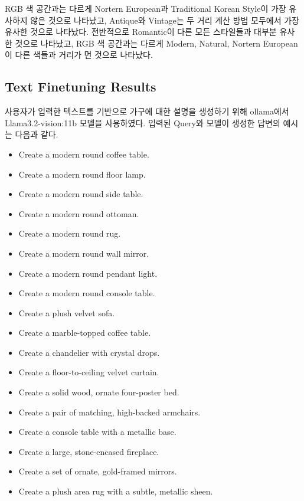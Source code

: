 \documentclass[11pt]{article}
\begin{document}
RGB 색 공간과는 다르게 Nortern European과 Traditional Korean Style이 가장 유사하지 않은 것으로 나타났고, Antique와 Vintage는 두 거리 계산 방법 모두에서 가장 유사한 것으로 나타났다.
전반적으로 Romantic이 다른 모든 스타일들과 대부분 유사한 것으로 나타났고, RGB 색 공간과는 다르게 Modern, Natural, Nortern European이 다른 색들과 거리가 먼 것으로 나타났다.

\subsection{Text Finetuning Results}
사용자가 입력한 텍스트를 기반으로 가구에 대한 설명을 생성하기 위해 ollama에서 Llama3.2-vision:11b 모델을 사용하였다.
입력된 Query와 모델이 생성한 답변의 예시는 다음과 같다.

\begin{description}[labelindent=0cm]
    \item[\textbf{Q1.} A modern room contains round items] 
    \item[\textbf{A1.}]
          \begin{itemize}[noitemsep, topsep=2pt]
              \item Create a modern round coffee table.
              \item Create a modern round floor lamp.
              \item Create a modern round side table.
              \item Create a modern round ottoman.
              \item Create a modern round rug.
              \item Create a modern round wall mirror.
              \item Create a modern round pendant light.
              \item Create a modern round console table.
          \end{itemize}

    \item[\textbf{Q2.} Let me show luxurious room]
    \item[\textbf{A1.}]
          \begin{itemize}[noitemsep, topsep=2pt]
              \item Create a plush velvet sofa.
              \item Create a marble-topped coffee table.
              \item Create a chandelier with crystal drops.
              \item Create a floor-to-ceiling velvet curtain.
              \item Create a solid wood, ornate four-poster bed.
              \item Create a pair of matching, high-backed armchairs.
              \item Create a console table with a metallic base.
              \item Create a large, stone-encased fireplace.
              \item Create a set of ornate, gold-framed mirrors.
              \item Create a plush area rug with a subtle, metallic sheen.
          \end{itemize}


\end{description}
\end{document}
